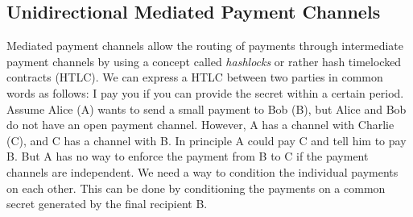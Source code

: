 \subsection{Unidirectional Mediated Payment Channels}

Mediated payment channels allow the routing of payments through intermediate payment channels by using a concept called \emph{hashlocks} or rather hash timelocked contracts (HTLC). We can express a HTLC between two parties in common words as follows: I pay you if you can provide the secret within a certain period. Assume Alice (A) wants to send a small payment to Bob (B), but Alice and Bob do not have an open payment channel. However, A has a channel with Charlie (C), and C has a channel with B. In principle A could pay C and tell him to pay B. But A has no way to enforce the payment from B to C if the payment channels are independent. We need a way to condition the individual payments on each other. This can be done by conditioning the payments on a common secret generated by the final recipient B. 


